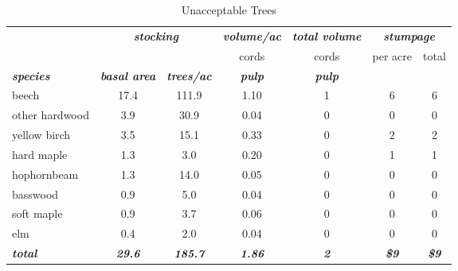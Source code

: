 \documentclass[landscape]{article}
\begin{document}
\begin{table}[H]

\caption{\label{tab:unnamed-chunk-50}Unacceptable Trees}
\fontsize{10}{12}\selectfont
\begin{tabular}[t]{lcccccc}
\toprule
\multicolumn{1}{c}{\em{\textbf{ }}} & \multicolumn{2}{c}{\em{\textbf{stocking}}} & \multicolumn{1}{c}{\em{\textbf{volume/ac }}} & \multicolumn{1}{c}{\em{\textbf{total volume}}} & \multicolumn{2}{c}{\em{\textbf{stumpage}}} \\
\cmidrule(l{3pt}r{3pt}){2-3} \cmidrule(l{3pt}r{3pt}){4-4} \cmidrule(l{3pt}r{3pt}){5-5} \cmidrule(l{3pt}r{3pt}){6-7}
\multicolumn{3}{c}{ } & \multicolumn{1}{c}{cords} & \multicolumn{1}{c}{cords} & \multicolumn{1}{c}{per acre} & \multicolumn{1}{c}{total} \\
\cmidrule(l{3pt}r{3pt}){4-4} \cmidrule(l{3pt}r{3pt}){5-5} \cmidrule(l{3pt}r{3pt}){6-6} \cmidrule(l{3pt}r{3pt}){7-7}
\rowcolor[HTML]{DCDCDC}  \em{\textbf{species}} & \em{\textbf{basal area}} & \em{\textbf{trees/ac}} & \em{\textbf{pulp}} & \em{\textbf{pulp}} & \em{\textbf{ }} & \em{\textbf{ }}\\
\midrule
\rowcolor{gray!6}  beech & 17.4 & 111.9 & 1.10 & 1 & 6 & 6\\
 
other hardwood & 3.9 & 30.9 & 0.04 & 0 & 0 & 0\\
 
\rowcolor{gray!6}  yellow birch & 3.5 & 15.1 & 0.33 & 0 & 2 & 2\\
 
hard maple & 1.3 & 3.0 & 0.20 & 0 & 1 & 1\\
 
\rowcolor{gray!6}  hophornbeam & 1.3 & 14.0 & 0.05 & 0 & 0 & 0\\
 
basswood & 0.9 & 5.0 & 0.04 & 0 & 0 & 0\\
 
\rowcolor{gray!6}  soft maple & 0.9 & 3.7 & 0.06 & 0 & 0 & 0\\
 
elm & 0.4 & 2.0 & 0.04 & 0 & 0 & 0\\
 
\rowcolor{gray!6}  \rowcolor[HTML]{DCDCDC}  \em{\textbf{total}} & \em{\textbf{29.6}} & \em{\textbf{185.7}} & \em{\textbf{1.86}} & \em{\textbf{2}} & \em{\textbf{\$9}} & \em{\textbf{\$9}}\\
\bottomrule
\end{tabular}
\end{table}
\end{document}
